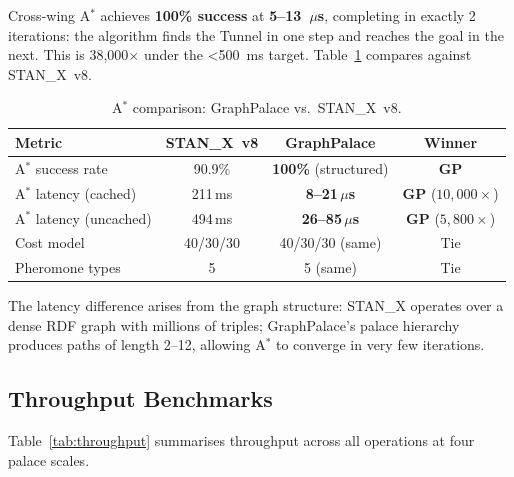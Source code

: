 \documentclass[11pt,a4paper]{article}
\begin{document}
Cross-wing A$^*$ achieves \textbf{100\% success} at \textbf{5--13~$\mu$s},
completing in exactly 2 iterations: the algorithm finds the Tunnel in one step
and reaches the goal in the next.  This is 38,000$\times$ under the
\textless500~ms target.  Table~\ref{tab:astar_vs_stanx} compares against
STAN\_X~v8.

\begin{table}[ht]
\centering
\caption{A$^*$ comparison: GraphPalace vs.\ STAN\_X~v8.}
\label{tab:astar_vs_stanx}
\begin{tabular}{lccc}
\toprule
\textbf{Metric} & \textbf{STAN\_X~v8} & \textbf{GraphPalace} & \textbf{Winner} \\
\midrule
A$^*$ success rate       & 90.9\%    & \textbf{100\%} (structured)  & \textbf{GP} \\
A$^*$ latency (cached)   & 211\,ms   & \textbf{8--21\,$\mu$s}       & \textbf{GP} ($10{,}000\times$) \\
A$^*$ latency (uncached) & 494\,ms   & \textbf{26--85\,$\mu$s}      & \textbf{GP} ($5{,}800\times$) \\
Cost model               & 40/30/30  & 40/30/30 (same)              & Tie \\
Pheromone types          & 5         & 5 (same)                     & Tie \\
\bottomrule
\end{tabular}
\end{table}

The latency difference arises from the graph structure: STAN\_X operates over
a dense RDF graph with millions of triples; GraphPalace's palace hierarchy
produces paths of length 2--12, allowing A$^*$ to converge in very few
iterations.

\subsection{Throughput Benchmarks}
\label{sec:throughput_bench}

Table~\ref{tab:throughput} summarises throughput across all operations at four
palace scales.
\end{document}
